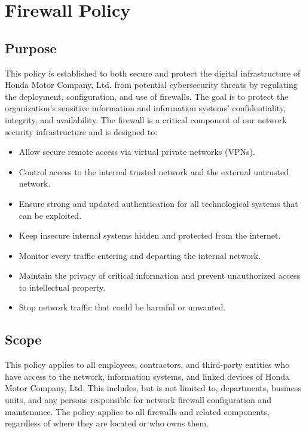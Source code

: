 \chapter{Firewall Policy}
\pagestyle{fancy}

\fancyhf{}

\fancyfoot[C]{\thepage}

\renewcommand{\headrulewidth}{0pt}
\renewcommand{\footrulewidth}{0pt}

\section{Purpose}
This policy is established to both secure and protect the digital infrastructure of Honda Motor Company, Ltd. from potential cybersecurity threats by regulating the deployment, configuration, and use of firewalls. The goal is to protect the organization's sensitive information and information systems' confidentiality, integrity, and availability. The firewall is a critical component of our network security infrastructure and is designed to:
\begin{itemize}
    \item Allow secure remote access via virtual private networks (VPNs).
    \item Control access to the internal trusted network and the external untrusted network.
    \item Ensure strong and updated authentication for all technological systems that can be exploited.
    \item Keep insecure internal systems hidden and protected from the internet.
    \item Monitor every traffic entering and departing the internal network.
    \item Maintain the privacy of critical information and prevent unauthorized access to intellectual property.
    \item Stop network traffic that could be harmful or unwanted.
\end{itemize}

\section{Scope}
This policy applies to all employees, contractors, and third-party entities who have access to the network, information systems, and linked devices of Honda Motor Company, Ltd. This includes, but is not limited to, departments, business units, and any persons responsible for network firewall configuration and maintenance. The policy applies to all firewalls and related components, regardless of where they are located or who owns them.

